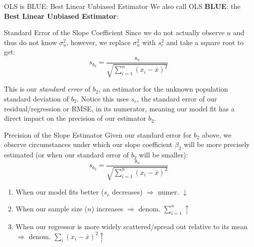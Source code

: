 \documentclass[
  ignorenonframetext,
  english,
]{beamer}
\begin{document}
\begin{frame}{OLS is BLUE: Best Linear Unbiased Estimator}
\protect{}\label{ols-is-blue-best-linear-unbiased-estimator}
We also call OLS \textbf{BLUE}: the \textbf{Best Linear Unbiased
Estimator}:

\end{frame}

\begin{frame}{Standard Error of the Slope Coefficient}
\protect{}\label{standard-error-of-the-slope-coefficient}
Since we do not actually observe \(u\) and thus do not know
\(\sigma^2_u\), however, we replace \(\sigma^2_u\) with \(s^2_e\) and
take a square root to get:
\[s_{b_2}=\frac{s_e}{\sqrt{\sum_{i=1}^n(x_i-\bar{x})^2}}\]

This is our \emph{standard error} of \(b_2\), an estimator for the
unknown population standard deviation of \(b_2\). Notice this uses
\(s_e\), the standard error of our residual/regression or RMSE, in its
numerator, meaning our model fit has a direct impact on the precision of
our estimator \(b_2\).
\end{frame}

\begin{frame}{Precision of the Slope Estimator}
\protect{}\label{precision-of-the-slope-estimator}
Given our standard error for \(b_2\) above, we observe circumstances
under which our slope coefficient \(\beta_2\) will be more precisely
estimated (or when our standard error of \(b_2\) will be smaller):
\[s_{b_2}=\frac{s_e}{\sqrt{\sum_{i=1}^n(x_i-\bar{x})^2}}\]

\begin{enumerate}
\item
  When our model fits better (\(s_e\) decreases) \(\Rightarrow\) numer.
  \(\downarrow\)
\item
  When our sample size (\(n\)) increases \(\Rightarrow\) denom.
  \(\sum_{i=1}^n \uparrow\)
\item
  When our regressor is more widely scattered/spread out relative to its
  mean \(\Rightarrow\) denom. \(\sum_i(x_i-\bar{x})^2\uparrow\)
\end{enumerate}
\end{frame}
\end{document}
